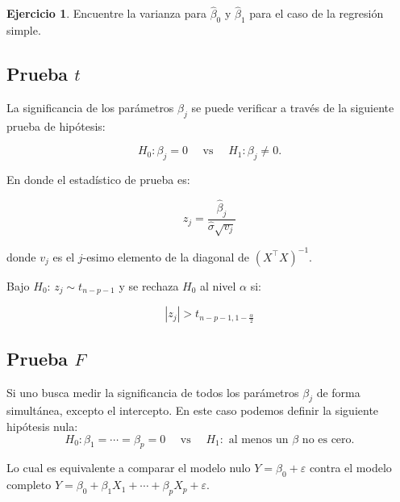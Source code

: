\documentclass[
  12pt,
]{book}
\theoremstyle{definition}
\theoremstyle{definition}
\theoremstyle{definition}
\newtheorem{exercise}{Ejercicio}[chapter]
\theoremstyle{definition}
\theoremstyle{remark}
\begin{document}
\begin{exercise}
\protect\hypertarget{exr:unnamed-chunk-117}{}\label{exr:unnamed-chunk-117}Encuentre la varianza para \(\hat \beta_{0}\) y \(\hat \beta_{1}\) para el caso de la regresión simple.
\end{exercise}

\hypertarget{prueba-t}{%
\subsection{\texorpdfstring{Prueba \(t\)}{Prueba t}}\label{prueba-t}}

La significancia de los parámetros \(\beta_j\) se puede verificar a través de la siguiente prueba de hipótesis:

\begin{equation*}
 H_{0}: \beta_{j} = 0 \quad \text{ vs } \quad H_{1}:\beta_{j}\neq 0.
 \end{equation*}

En donde el estadístico de prueba es:

\begin{equation*}
 z_{j} = \frac{\hat{\beta}_{j}}{\hat{\sigma} \sqrt{v_{j}}} 
 \end{equation*}

donde \(v_{j}\) es el \(j\)-esimo elemento de la diagonal de \((X^{\top}X)^{-1}\).

Bajo \(H_{0}\): \(z_{j} \sim t_{n-p-1}\) y se rechaza \(H_{0}\) al nivel \(\alpha\) si:

\begin{equation*}
 \left\vert z_{j} \right\vert > t_{n-p-1, 1-\frac{\alpha}{2}} 
 \end{equation*}

\hypertarget{prueba-f}{%
\subsection{\texorpdfstring{Prueba \(F\)}{Prueba F}}\label{prueba-f}}

Si uno busca medir la significancia de todos los parámetros \(\beta_j\) de forma simultánea, excepto el intercepto. En este caso podemos definir la siguiente hipótesis nula:
\begin{equation*}
 H_{0}: \beta_{1} = \cdots =\beta_{p} = 0 \quad 
 \text{  vs   }\quad H_{1}: \text{ al menos un \(\beta\) no es cero}.
 \end{equation*}

Lo cual es equivalente a comparar el modelo nulo \(Y=\beta_{0}+\varepsilon\) contra el modelo completo \(Y=\beta_{0}+ \beta_{1}X_{1} + \cdots + \beta_{p}X_{p} + \varepsilon\).
\end{document}
